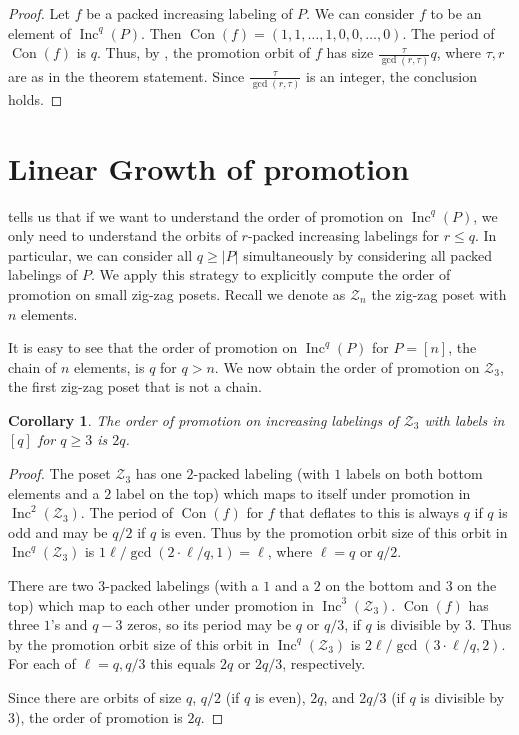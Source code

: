 \documentclass[11pt]{amsart}
\newtheorem{corollary}[theorem]{Corollary}
\theoremstyle{definition}
\DeclareMathOperator{\Inc}{\mathrm{Inc}}
\DeclareMathOperator{\Con}{\mathrm{Con}}
\newcommand{\calZ}{\mathcal{Z}}
\begin{document}
\begin{proof}
    Let $f$ be a packed increasing labeling of $P$.  We can consider $f$ to be an element of $\Inc^q(P)$. Then $\Con(f)=(1,1,\dots,1,0,0,\dots,0)$.  The period of $\Con(f)$ is $q$.  Thus, by , the promotion orbit of $f$ has size $\displaystyle\frac{\tau}{\gcd(r,\tau)}q$, where $\tau,r$ are as in the theorem statement.  Since $\displaystyle\frac{\tau}{\gcd(r,\tau)}$ is an integer, the conclusion holds.
\end{proof}


\section{Linear Growth of promotion}
\label{sec:lin_growth}

 tells us that if we want to understand the order of promotion on  $\Inc^q(P)$, we only need to understand the orbits of $r$-packed increasing labelings for $r \leq q$. In particular, we can consider all $q \geq \vert P \vert$ simultaneously by considering all packed labelings of $P$. We apply this strategy to explicitly compute the order of promotion on small zig-zag posets. 
Recall  we denote as $\calZ_n$ the zig-zag poset with $n$ elements. 


It is easy to see that the order of promotion on $\Inc^q(P)$ for $P=[n]$, the chain of $n$ elements, is $q$ for $q>n$. 
We now obtain the order of promotion on $\calZ_3$, the first zig-zag poset that is not a chain. 

\begin{corollary}\label{thm:linear-Z3}
The order of promotion on increasing labelings of $\calZ_3$ with labels in $[q]$ for $q \geq 3$ is $2q$.
\end{corollary}
\begin{proof}
The poset
$\calZ_3$ has one $2$-packed labeling (with $1$ labels on both bottom elements and a $2$ label on the top) which maps to itself under promotion in $\Inc^2(\calZ_3)$. The period of $\Con(f)$ for $f$ that deflates to this is always $q$ if $q$ is odd and may be $q/2$ if $q$ is even. Thus by  the promotion orbit size of this orbit in $\Inc^q(\calZ_3)$ is $1\ell/\gcd(2\cdot \ell/q,1)=\ell$, where $\ell=q$ or $q/2$.

There are two $3$-packed labelings (with a $1$ and a $2$ on the bottom and $3$ on the top) which map to each other under promotion in $\Inc^3(\calZ_3)$. $\Con(f)$ has three $1$'s and $q-3$ zeros, so its period may be $q$ or $q/3$, if $q$ is divisible by $3$. Thus by  the promotion orbit size of this orbit in $\Inc^q(\calZ_3)$ is $2\ell/\gcd(3\cdot \ell/q,2)$. For each of $\ell=q,q/3$ this equals $2q$ or $2q/3$, respectively.

Since there are orbits of size $q$, $q/2$ (if $q$ is even), $2q$, and $2q/3$ (if $q$ is divisible by 3), the order of promotion is $2q$.
\end{proof}
\end{document}
